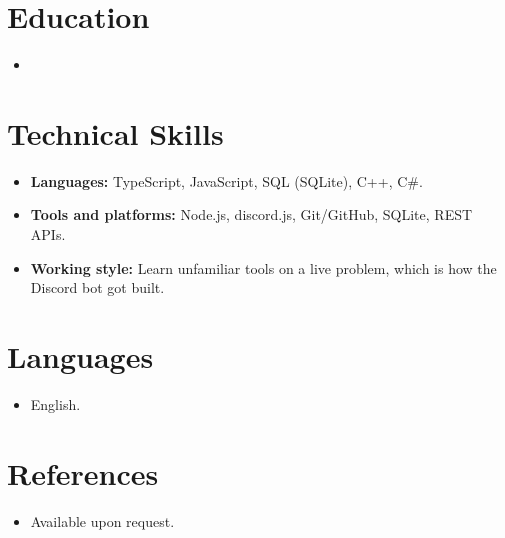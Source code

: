\documentclass[11pt,a4paper,sans]{moderncv}
\begin{document}
\section{Education}
\vspace{1pt}
\begin{itemize}

\item{}

\end{itemize}

\section{Technical Skills}
\vspace{1pt}
\begin{itemize}
\item \textbf{Languages:} TypeScript, JavaScript, SQL (SQLite), C++, C\#.
\item \textbf{Tools and platforms:} Node.js, discord.js, Git/GitHub, SQLite, REST APIs.
\item \textbf{Working style:} Learn unfamiliar tools on a live problem, which is how the Discord bot got built.
\end{itemize}

\section{Languages}
\vspace{1pt}
\begin{itemize}
\item English.
\end{itemize}

\section{References}
\vspace{1pt}
\begin{itemize}
\item{Available upon request.}
\end{itemize}
\end{document}
